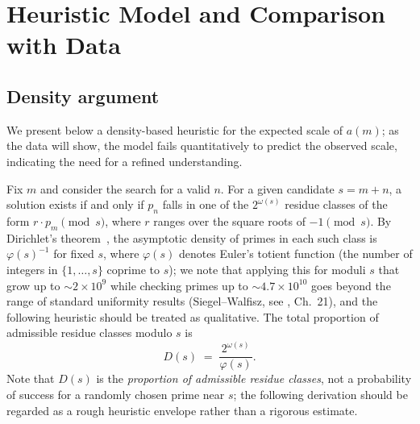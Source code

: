 \documentclass{amsart}
\theoremstyle{definition}
\theoremstyle{remark}
\numberwithin{equation}{section}
\begin{document}
\section{Heuristic Model and Comparison with Data}
\label{sec:heuristic}

\subsection{Density argument}

We present below a density-based heuristic for the expected scale
of $a(m)$; as the data will show, the model fails quantitatively
to predict the observed scale, indicating the need for a refined
understanding.

Fix $m$ and consider the search for a valid $n$.
For a given candidate $s = m + n$, a solution exists if and only if
$p_n$ falls in one of the $2^{\omega(s)}$ residue classes of the form
$r \cdot p_m \pmod{s}$, where $r$ ranges over the square roots of
$-1 \pmod{s}$.
By Dirichlet's theorem~\cite{Davenport}, the asymptotic density
of primes in each such class is $\varphi(s)^{-1}$ for fixed $s$,
where $\varphi(s)$ denotes Euler's totient function (the number of
integers in $\{1, \ldots, s\}$ coprime to $s$); we note
that applying this for moduli $s$ that grow up to $\sim 2 \times 10^9$
while checking primes up to $\sim 4.7 \times 10^{10}$ goes beyond the
range of standard uniformity results (Siegel--Walfisz,
see \cite{Davenport}, Ch.~21), and the following heuristic should be
treated as qualitative.
The total proportion of admissible residue classes modulo $s$ is
\[
D(s) \;=\; \frac{2^{\omega(s)}}{\varphi(s)}.
\]
Note that $D(s)$ is the \emph{proportion of admissible residue classes},
not a probability of success for a randomly chosen prime near $s$;
the following derivation should be regarded as a rough heuristic
envelope rather than a rigorous estimate.
\end{document}
